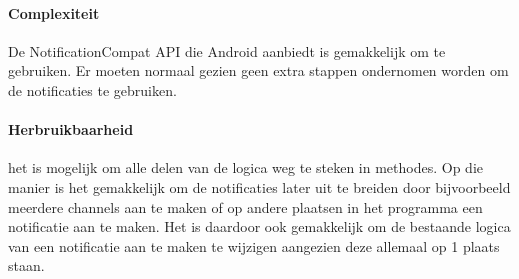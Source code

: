 \paragraph{Complexiteit}
De NotificationCompat API die Android aanbiedt is gemakkelijk om te gebruiken. 
Er moeten normaal gezien geen extra stappen ondernomen worden om de notificaties 
te gebruiken.

\paragraph{Herbruikbaarheid}
het is mogelijk om alle delen van de logica weg te steken in methodes. Op die manier 
is het gemakkelijk om de notificaties later uit te breiden door bijvoorbeeld meerdere channels aan te maken
of op andere plaatsen in het programma een notificatie aan te maken. Het is daardoor ook gemakkelijk om de 
bestaande logica van een notificatie aan te maken te wijzigen aangezien deze allemaal op 1 plaats staan.